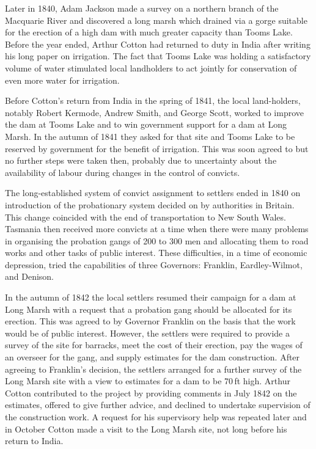 Later in 1840, Adam Jackson made a survey on a northern branch of the
Macquarie River and discovered a long marsh which drained via a gorge
suitable for the erection of a high dam with much greater capacity
than Tooms Lake.  Before the year ended, Arthur Cotton had returned to
duty in India after writing his long paper on irrigation.  The fact
that Tooms Lake was holding a satisfactory volume of water stimulated
local landholders to act jointly for conservation of even more water
for irrigation.

Before Cotton's return from India in the spring of 1841, the local
land-holders, notably Robert Kermode, Andrew Smith, and George Scott,
worked to improve the dam at Tooms Lake and to win government support
for a dam at Long Marsh.  In the autumn of 1841 they asked for that
site and Tooms Lake to be reserved by government for the benefit of
irrigation.  This was soon agreed to but no further steps were taken
then, probably due to uncertainty about the availability of labour
during changes in the control of convicts.

The long-established system of convict assignment to settlers ended in
1840 on introduction of the probationary system decided on by
authorities in Britain.  This change coincided with the end of
transportation to New South Wales.  Tasmania then received more
convicts at a time when there were many problems in organising the
probation gangs of 200 to 300 men and allocating them to road works
and other tasks of public interest.  These difficulties, in a time of
economic depression, tried the capabilities of three Governors:
Franklin, Eardley-Wilmot, and Denison.

In the autumn of 1842 the local settlers resumed their campaign for a
dam at Long Marsh with a request that a probation gang should be
allocated for its erection.  This was agreed to by Governor Franklin
on the basis that the work would be of public interest.  However, the
settlers were required to provide a survey of the site for barracks,
meet the cost of their erection, pay the wages of an overseer for the
gang, and supply estimates for the dam construction.  After agreeing
to Franklin's decision, the settlers arranged for a further survey of
the Long Marsh site with a view to estimates for a dam to be 70\,ft
high.  Arthur Cotton contributed to the project by providing comments
in July 1842 on the estimates, offered to give further advice, and
declined to undertake supervision of the construction work.  A request
for his supervisory help was repeated later and in October Cotton made
a visit to the Long Marsh site, not long before his return to
India.


